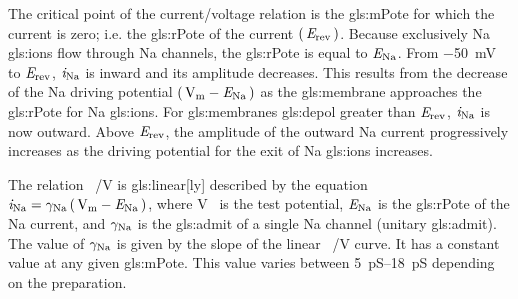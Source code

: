 \documentclass[class={myRUCProject}, crop=false]{standalone}
\begin{document}
The critical point of the current/voltage relation is the \gls{gls:mPote} for which the current is zero; i.e. the \gls{gls:rPote} of the current \(\left(\,\mathit{E}_\mathrm{rev}\,\right)\). 
Because exclusively \gls{Na} \glspl{gls:ion} flow through \gls{Na} channels, the \gls{gls:rPote} is equal to \(\mathit{E}_\mathrm{Na}\). 
From \qty{-50}{\mV} to \(\mathit{E}_\mathrm{rev}\), \(\mathit{i}_\mathrm{Na}\) is inward and its amplitude decreases. This results from the decrease of the \gls{Na} driving potential \(\br{\unit{\V\membrane}-\equi\sodium}\) as the \gls{gls:membrane} approaches the \gls{gls:rPote} for \gls{Na} \glspl{gls:ion}. 
For \glspl{gls:membrane} \gls{gls:depol} greater than \(\mathit{E}_\mathrm{rev}\), \(\mathit{i}_\mathrm{Na}\) is now outward. Above \(\mathit{E}_\mathrm{rev}\), the amplitude of the outward \gls{Na} current progressively increases as the driving potential for the exit of \gls{Na} \glspl{gls:ion} increases. 

The relation \unit[per-mode = symbol]{\ucur\sodium\per\V} is \gls{gls:linear}[ly] described by the equation \(\ucur\sodium = \ucon\sodium \br{\unit{\V\membrane}-\equi\sodium}\), where \unit{\V\membrane} is the test potential, \(\mathit{E}_\mathrm{Na}\) is the \gls{gls:rPote} of the \gls{Na} current, and \(\gamma_\mathrm{Na}\) is the \gls{gls:admit} of a single \gls{Na} channel (unitary \gls{gls:admit}). The value of \(\gamma_\mathrm{Na}\) is given by the slope of the linear \unit[per-mode = symbol]{\ucur\sodium\per\V} curve. It has a constant value at any given \gls{gls:mPote}. This value varies between \qtyrange{5}{18}{\pico\siemens} depending on the preparation.

\end{document}
